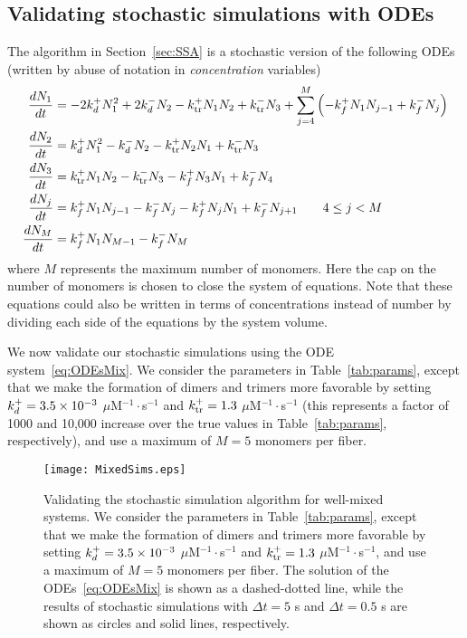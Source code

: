 \documentclass[11pt]{article}
\begin{document}
\subsection{Validating stochastic simulations with ODEs \label{sec:validationFibs}}
The algorithm in Section\ \ref{sec:SSA} is a stochastic version of the following ODEs  \cite{edelstein1998models} (written by abuse of notation in \emph{concentration} variables)
\begin{subequations}
\label{eq:ODEsMix}
\begin{align}
\frac{d N_1}{dt} &= -2 k_d^+ N_1^2 + 2 k_d^- N_2 - k_\text{tr}^+ N_1 N_2 + k_\text{tr}^- N_3 + \sum_{j=4}^M \left(- k_f^+ N_1 N_{j-1}+k_f^- N_j\right)\\
\frac{d N_2}{dt} &= k_d^+ N_1^2 - k_d^- N_2 -k_\text{tr}^+ N_2 N_1 + k_\text{tr}^- N_3 \\
\frac{d N_3}{dt} &= k_\text{tr}^+ N_1 N_2 - k_\text{tr}^- N_3 - k_f^+ N_3 N_1 + k_f^- N_4 \\
\frac{d N_j}{dt} & = k_f^+ N_1 N_{j-1} - k_f^- N_j - k_f^+ N_j N_1 + k_f^- N_{j+1} \qquad 4 \leq j < M \\
\frac{d N_M}{dt} & = k_f^+ N_1 N_{M-1} - k_f^- N_M
\end{align}
\end{subequations}
where $M$ represents the maximum number of monomers. Here the cap on the number of monomers is chosen to close the system of equations. Note that these equations could also be written in terms of concentrations instead of number by dividing each side of the equations by the system volume. 

We now validate our stochastic simulations using the ODE system\ \eqref{eq:ODEsMix}. We consider the parameters in Table\ \ref{tab:params}, except that we make the formation of dimers and trimers more favorable by setting $k_d^+ = 3.5 \times 10^{-3}$ $\mu$M$^{-1}\cdot$s$^{-1}$ and $k_\text{tr}^+ = 1.3$ $\mu$M$^{-1}\cdot$s$^{-1}$ (this represents a factor of 1000 and 10,000 increase over the true values in Table\ \ref{tab:params}, respectively), and use a maximum of $M=5$ monomers per fiber. 

\begin{figure}
\centering
\texttt{[image: MixedSims.eps]}
\caption{\label{fig:MixedSims}Validating the stochastic simulation algorithm for well-mixed systems. We consider the parameters in Table\ \ref{tab:params}, except that we make the formation of dimers and trimers more favorable by setting $k_d^+ = 3.5 \times 10^{-3}$ $\mu$M$^{-1}\cdot$s$^{-1}$ and $k_\text{tr}^+ = 1.3$ $\mu$M$^{-1}\cdot$s$^{-1}$, and use a maximum of $M=5$ monomers per fiber. The solution of the ODEs\ \eqref{eq:ODEsMix} is shown as a dashed-dotted line, while the results of stochastic simulations with $\Delta t = 5$ s and $\Delta t = 0.5$ s are shown as circles and solid lines, respectively.  }
\end{figure}
\end{document}
